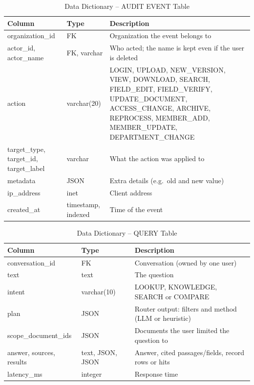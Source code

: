 \begin{table}[H]\centering\small
\caption{Data Dictionary -- AUDIT EVENT Table}\label{tab:dd-audit}
\begin{tabularx}{\textwidth}{|p{3.2cm}|p{2.6cm}|X|}\hline
\textbf{Column} & \textbf{Type} & \textbf{Description} \\ \hline
organization\_id & FK & Organization the event belongs to \\ \hline
actor\_id, actor\_name & FK, varchar & Who acted; the name is kept even if the user is deleted \\ \hline
action & varchar(20) & LOGIN, UPLOAD, NEW\_VERSION, VIEW, DOWNLOAD, SEARCH, FIELD\_EDIT, FIELD\_VERIFY, UPDATE\_DOCUMENT, ACCESS\_CHANGE, ARCHIVE, REPROCESS, MEMBER\_ADD, MEMBER\_UPDATE, DEPARTMENT\_CHANGE \\ \hline
target\_type, target\_id, target\_label & varchar & What the action was applied to \\ \hline
metadata & JSON & Extra details (e.g.\ old and new value) \\ \hline
ip\_address & inet & Client address \\ \hline
created\_at & timestamp, indexed & Time of the event \\ \hline
\end{tabularx}
\end{table}

\begin{table}[H]\centering\small
\caption{Data Dictionary -- QUERY Table}\label{tab:dd-query}
\begin{tabularx}{\textwidth}{|p{3.2cm}|p{2.6cm}|X|}\hline
\textbf{Column} & \textbf{Type} & \textbf{Description} \\ \hline
conversation\_id & FK & Conversation (owned by one user) \\ \hline
text & text & The question \\ \hline
intent & varchar(10) & LOOKUP, KNOWLEDGE, SEARCH or COMPARE \\ \hline
plan & JSON & Router output: filters and method (LLM or heuristic) \\ \hline
scope\_document\_ids & JSON & Documents the user limited the question to \\ \hline
answer, sources, results & text, JSON, JSON & Answer, cited passages/fields, record rows or hits \\ \hline
latency\_ms & integer & Response time \\ \hline
\end{tabularx}
\end{table}

